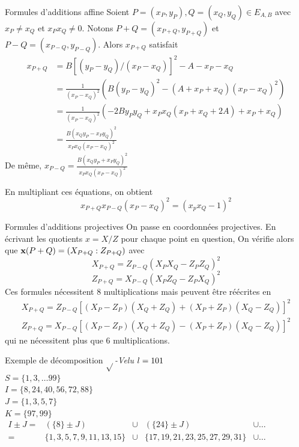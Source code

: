 \documentclass{beamer}
\begin{document}
\begin{frame}[noframenumbering]{Formules d'additions affine}\small
	Soient $P=(x_P,y_P), Q=(x_Q,y_Q) \in E_{A,B}$ avec $x_P \neq x_Q$ et $x_P x_Q \neq 0$.
	Notons $P+Q=(x_{P+Q},y_{P+Q})$ et $P-Q=(x_{P-Q},y_{P-Q})$. Alors $x_{P+Q}$ satisfait
	\[\begin{aligned}
		x_{P+Q}	&= B[(y_P - y_Q)/(x_P-x_Q)]^2 - A - x_P - x_Q \\
		&= \frac{1}{(x_P-x_Q)^2}( B(y_P - y_Q)^2 - (A + x_P + x_Q)(x_P - x_Q)^2) \\
		&= \frac{1}{(x_P-x_Q)^2}( -2B y_P y_Q + x_P x_Q (x_P + x_Q + 2A) + x_P + x_Q) \\
		&= \frac{B(x_Q y_P - x_P y_Q)^2}{x_P x_Q (x_P-x_Q)^2}
	\end{aligned}\]
	De même, $x_{P-Q} = \frac{B(x_Q y_P + x_P y_Q)^2}{x_P x_Q (x_P-x_Q)^2}$

	En multipliant ces équations, on obtient
	\[x_{P+Q} x_{P-Q} (x_P - x_Q)^2 = (x_p x_Q -1)^2\]
\end{frame}

\begin{frame}[noframenumbering]{Formules d'additions projectives}\small
	On passe en coordonnées projectives. En écrivant les quotients $x=X/Z$ pour chaque point en question,
	On vérifie alors que $\textbf{x}(P+Q)=(X_{P+Q}:Z_{P+Q})$ avec \[X_{P+Q} = Z_{P-Q}(X_P X_Q - Z_P Z_Q)^2\]\[Z_{P+Q} = X_{P-Q}(X_P Z_Q - Z_P X_Q)^2\]
	Ces formules nécessitent 8 multiplications mais peuvent être réécrites en
	\[\begin{array}{l}
		X_{P+Q} = Z_{P-Q}[(X_P-Z_P)(X_Q+Z_Q) + (X_P+Z_P)(X_Q-Z_Q)]^2\\
		Z_{P+Q} = X_{P-Q}[(X_P-Z_P)(X_Q+Z_Q) - (X_P+Z_P)(X_Q-Z_Q)]^2
	\end{array}\]
	qui ne nécessitent plus que 6 multiplications.
\end{frame}

\begin{frame}{Exemple de décomposition $\sqrt{}$\textit{-Velu}}
	$\mathnormal{l} = 101$\\
	$S = \lbrace 1, 3, \ldots 99 \rbrace$\\
	$I = \lbrace 8, 24, 40, 56, 72, 88 \rbrace $\\
	$J = \lbrace1, 3, 5, 7 \rbrace $\\
	$K = \lbrace 97, 99 \rbrace $\\
	
	$\begin{array}{rcccl}
		I\pm J =& (\{8\}\pm J) & \cup & (\{24\}\pm J) & \cup \ldots \\
		=&  {\scriptstyle \lbrace 1, 3, 5, 7, 9, 11, 13, 15\rbrace } & \cup &  {\scriptstyle \lbrace 17, 19, 21, 23, 25, 27, 29, 31\rbrace } & \cup \ldots
	\end{array}$
\end{frame}
\end{document}
